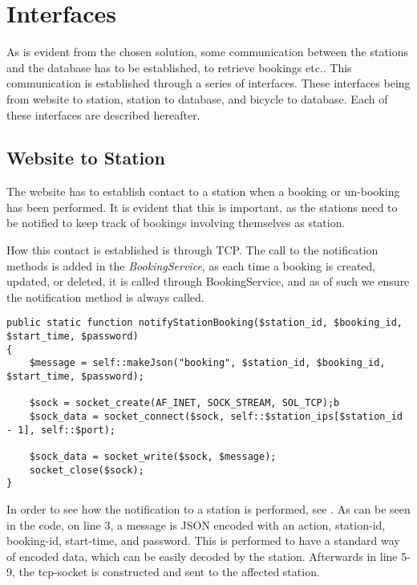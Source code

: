 \section{Interfaces}
As is evident from the chosen solution, some communication between the stations and the database has to be established, to retrieve bookings etc..
This communication is established through a series of interfaces.
These interfaces being from website to station, station to database, and bicycle to database.
Each of these interfaces are described hereafter.

\subsection{Website to Station}
The website has to establish contact to a station when a booking or un-booking has been performed.
It is evident that this is important, as the stations need to be notified to keep track of bookings involving themselves as station.

How this contact is established is through TCP.
The call to the notification methods is added in the \textit{BookingService}, as each time a booking is created, updated, or deleted, it is called through BookingService, and as of such we ensure the notification method is always called.

\begin{minipage}{\textwidth}
\begin{lstlisting}[caption = {Function for notifying a station of a new booking.}, label = {lst:notifystationbooking}]
public static function notifyStationBooking($station_id, $booking_id, $start_time, $password)
{
	$message = self::makeJson("booking", $station_id, $booking_id, $start_time, $password);
	
	$sock = socket_create(AF_INET, SOCK_STREAM, SOL_TCP);b
	$sock_data = socket_connect($sock, self::$station_ips[$station_id - 1], self::$port);
	
	$sock_data = socket_write($sock, $message);
	socket_close($sock);
}
\end{lstlisting}
\end{minipage}

In order to see how the notification to a station is performed, see .
As can be seen in the code, on line 3, a message is JSON encoded with an action, station-id, booking-id, start-time, and password.
This is performed to have a standard way of encoded data, which can be easily decoded by the station.
Afterwards in line 5-9, the tcp-socket is constructed and sent to the affected station.

